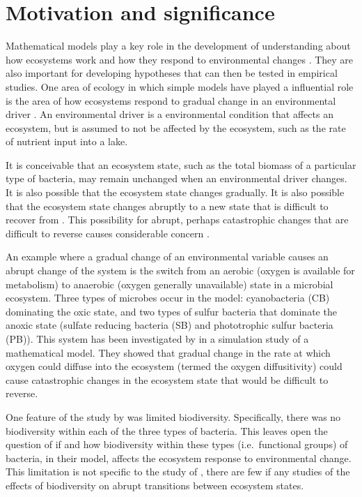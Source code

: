 \documentclass[]{elsarticle} %
\begin{document}
\hypertarget{motivation-and-significance}{%
\section{Motivation and
significance}\label{motivation-and-significance}}

Mathematical models play a key role in the development of understanding
about how ecosystems work and how they respond to environmental changes
\citep{Binzer2016a, Chaparro-Pedraza2021, Vasseur2005}. They are also
important for developing hypotheses that can then be tested in empirical
studies. One area of ecology in which simple models have played a
influential role is the area of how ecosystems respond to gradual change
in an environmental driver \citep{Scheffer2001}. An environmental driver
is a environmental condition that affects an ecosystem, but is assumed
to not be affected by the ecosystem, such as the rate of nutrient input
into a lake.

It is conceivable that an ecosystem state, such as the total biomass of
a particular type of bacteria, may remain unchanged when an
environmental driver changes. It is also possible that the ecosystem
state changes gradually. It is also possible that the ecosystem state
changes abruptly to a new state that is difficult to recover from
\citep{Scheffer2001}. This possibility for abrupt, perhaps catastrophic
changes that are difficult to reverse causes considerable concern
\citep{Collins2021, Northrop2021, Vandermeer2019}.

An example where a gradual change of an environmental variable causes an
abrupt change of the system is the switch from an aerobic (oxygen is
available for metabolism) to anaerobic (oxygen generally unavailable)
state in a microbial ecosystem. Three types of microbes occur in the
model: cyanobacteria (CB) dominating the oxic state, and two types of
sulfur bacteria that dominate the anoxic state (sulfate reducing
bacteria (SB) and phototrophic sulfur bacteria (PB)). This system has
been investigated by \citet{Bush2017} in a simulation study of a
mathematical model. They showed that gradual change in the rate at which
oxygen could diffuse into the ecosystem (termed the oxygen
diffusitivity) could cause catastrophic changes in the ecosystem state
that would be difficult to reverse.

One feature of the study by \citet{Bush2017} was limited biodiversity.
Specifically, there was no biodiversity within each of the three types
of bacteria. This leaves open the question of if and how biodiversity
within these types (i.e.~functional groups) of bacteria, in their model,
affects the ecosystem response to environmental change. This limitation
is not specific to the study of \citet{Bush2017}, there are few if any
studies of the effects of biodiversity on abrupt transitions between
ecosystem states.
\end{document}

